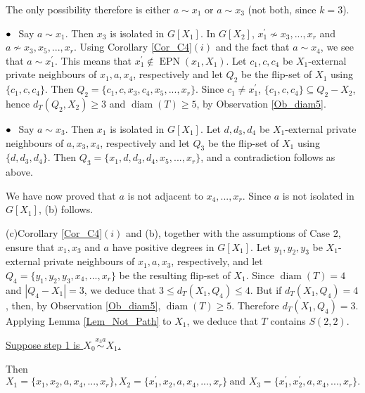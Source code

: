 \documentclass[12pt]{article}%
\begin{document}
The only possibility therefore is either $a\sim x_{1}$ or $a\sim x_{3}$ (not
both, since $k=3$).

$\bullet\hspace{0.1in}$Say $a\sim x_{1}$. Then $x_{3}$ is isolated in
$G[X_{1}]$. In $G[X_{2}]$, $x_{1}^{\prime}\nsim x_{3},...,x_{r}$ and $a\nsim
x_{3},x_{5},...,x_{r}$. Using Corollary \ref{Cor_C4}$(i)$ and the fact that
$a\sim x_{4}$, we see that $a\sim x_{1}^{\prime}$. This means that
$x_{1}^{\prime}\notin\operatorname{EPN}(x_{1},X_{1})$. Let $c_{1},c,c_{4}$ be
$X_{1}$-external private neighbours of $x_{1},a,x_{4}$, respectively and let
$Q_{2}$ be the flip-set of $X_{1}$ using $\{c_{1},c,c_{4}\}$. Then
$Q_{2}=\{c_{1},c,x_{3},c_{4},x_{5},...,x_{r}\}$. Since $c_{1}\neq
x_{1}^{\prime}$, $\{c_{1},c,c_{4}\}\subseteq Q_{2}-X_{2}$, hence $d_{T}%
(Q_{2},X_{2})\geq3$ and $\operatorname{diam}(T)\geq5$, by Observation
\ref{Ob_diam5}.

$\bullet\hspace{0.1in}$Say $a\sim x_{3}$. Then $x_{1}$ is isolated in
$G[X_{1}]$. Let $d,d_{3},d_{4}$ be $X_{1}$-external private neighbours of
$a,x_{3},x_{4}$, respectively and let $Q_{3}$ be the flip-set of $X_{1}$ using
$\{d,d_{3},d_{4}\}$. Then $Q_{3}=\{x_{1},d,d_{3},d_{4},x_{5},...,x_{r}\}$, and
a contradiction follows as above.

We have now proved that $a$ is not adjacent to $x_{4},...,x_{r}$. Since $a$ is
not isolated in $G[X_{1}]$, (b) follows.\smallskip

\noindent(c)\hspace{0.1in}Corollary \ref{Cor_C4}$(i)$ and (b), together with
the assumptions of Case 2, ensure that $x_{1},x_{3}$ and $a$ have positive
degrees in $G[X_{1}]$. Let $y_{1},y_{2},y_{3}$ be $X_{1}$-external private
neighbours of $x_{1},a,x_{3}$, respectively, and let $Q_{4}=\{y_{1}%
,y_{2},y_{3},x_{4},...,x_{r}\}$ be the resulting flip-set of $X_{1}$. Since
$\operatorname{diam}(T)=4$ and $|Q_{4}-X_{1}|=3$, we deduce that $3\leq
d_{T}(X_{1},Q_{4})\leq4$. But if $d_{T}(X_{1},Q_{4})=4$, then, by Observation
\ref{Ob_diam5}, $\operatorname{diam}(T)\geq5$. Therefore $d_{T}(X_{1}%
,Q_{4})=3$. Applying Lemma \ref{Lem_Not_Path} to $X_{1}$, we deduce that $T$
contains $S(2,2)$.\medskip\ 

\noindent\underline{Suppose step 1 is $X_{0}\overset{x_{3}a}{\sim}X_{1}$.}

Then%
\[
X_{1}=\{x_{1},x_{2},a,x_{4},...,x_{r}\},X_{2}=\{x_{1}^{\prime},x_{2}%
,a,x_{4},...,x_{r}\}\ \text{and\ }X_{3}=\{x_{1}^{\prime},x_{2}^{\prime
},a,x_{4},...,x_{r}\}.
\]
\end{document}
